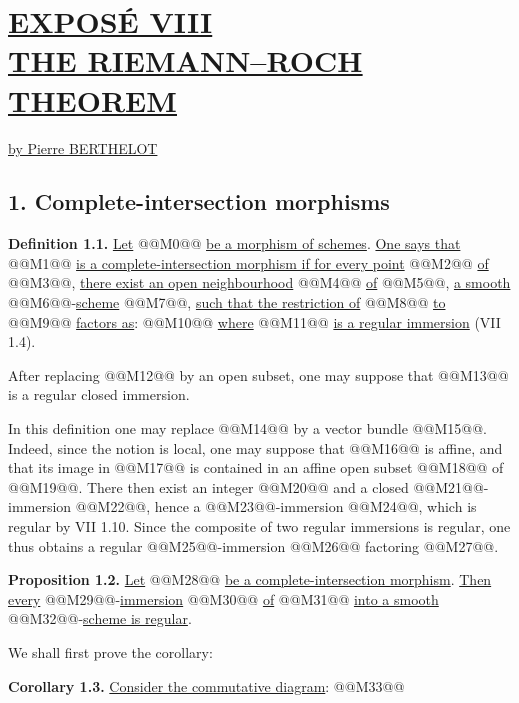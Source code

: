 \section*{\underline{EXPOSÉ VIII}\\[3pt] \underline{\underline{THE RIEMANN--ROCH THEOREM}}}
\begin{center}
\underline{by Pierre BERTHELOT}
\end{center}

\subsection*{1. Complete-intersection morphisms}

\textbf{Definition 1.1.} \uline{Let} @@M0@@ \uline{be a morphism of schemes}. \uline{One says that} @@M1@@ \uline{is a complete-intersection morphism if for every point} @@M2@@ \uline{of} @@M3@@, \uline{there exist an open neighbourhood} @@M4@@ \uline{of} @@M5@@, \uline{a smooth} @@M6@@-\uline{scheme} @@M7@@, \uline{such that the restriction of} @@M8@@ \uline{to} @@M9@@ \uline{factors as}:
@@M10@@
\uline{where} @@M11@@ \uline{is a regular immersion} (VII 1.4).

After replacing @@M12@@ by an open subset, one may suppose that @@M13@@ is a regular closed immersion.

In this definition one may replace @@M14@@ by a vector bundle @@M15@@. Indeed, since the notion is local, one may suppose that @@M16@@ is affine, and that its image in @@M17@@ is contained in an affine open subset @@M18@@ of @@M19@@. There then exist an integer @@M20@@ and a closed @@M21@@-immersion @@M22@@, hence a @@M23@@-immersion @@M24@@, which is regular by VII 1.10. Since the composite of two regular immersions is regular, one thus obtains a regular @@M25@@-immersion @@M26@@ factoring @@M27@@.

\textbf{Proposition 1.2.} \uline{Let} @@M28@@ \uline{be a complete-intersection morphism}. \uline{Then every} @@M29@@-\uline{immersion} @@M30@@ \uline{of} @@M31@@ \uline{into a smooth} @@M32@@-\uline{scheme is regular}.

We shall first prove the corollary:

\textbf{Corollary 1.3.} \uline{Consider the commutative diagram}:
@@M33@@
